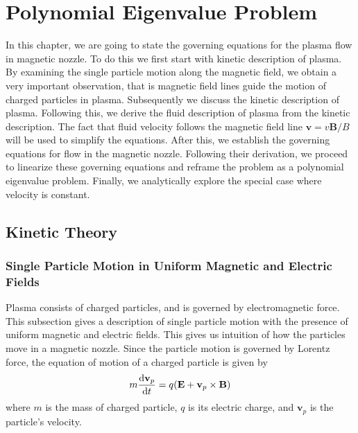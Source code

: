 \chapter{Polynomial Eigenvalue Problem} \label{chap:polynomial-eigenvalue-problem}
In this chapter, we are going to state the governing equations for the plasma flow in magnetic nozzle. To do this we first start with kinetic description of plasma. By examining the single particle motion along the magnetic field, we obtain a very important observation, that is magnetic field lines guide the motion of charged particles in plasma. Subsequently we discuss the kinetic description of plasma. Following this, we derive the fluid description of plasma from the kinetic description. The fact that fluid velocity follows the magnetic field line $\mathbf{v} = v\mathbf{B}/B$ will be used to simplify the equations. After this, we establish the governing equations for flow in the magnetic nozzle. Following their derivation, we proceed to linearize these governing equations and reframe the problem as a polynomial eigenvalue problem. Finally, we analytically explore the special case where velocity is constant.

\section{Kinetic Theory}
\subsection{Single Particle Motion in Uniform Magnetic and Electric Fields} \label{sec:single-particle-motion}
Plasma consists of charged particles, and is governed by electromagnetic force. This subsection gives a description of single particle motion with the presence of uniform magnetic and electric fields. This gives us intuition of how the particles move in a magnetic nozzle. Since the particle motion is governed by Lorentz force, the equation of motion of a charged particle is given by
\begin{equation}
	m\dv{\mathbf{v}_p}{t} = q(\mathbf{E} + \mathbf{v}_p\times \mathbf{B})
	\label{eq:equation-of-motion-single-particle}
\end{equation}
where $m$ is the mass of charged particle, $q$ is its electric charge, and $\mathbf{v}_p$ is the particle's velocity.

